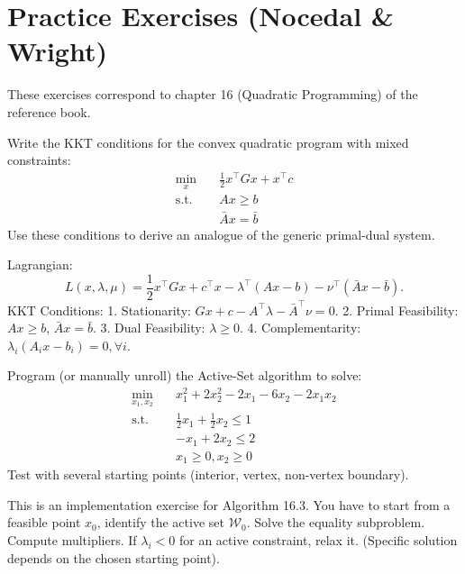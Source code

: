 \section{Practice Exercises (Nocedal \& Wright)}
\label{sec:11.exercises}

These exercises correspond to chapter 16 (Quadratic Programming) of the reference book.

\bigskip
\begin{exercice}
Write the KKT conditions for the convex quadratic program with mixed constraints:
\begin{align*}
    \min_x \quad & \frac{1}{2} x^\top G x + x^\top c \\
    \text{s.t. } \quad & Ax \ge b \\
               & \bar{A}x = \bar{b}
\end{align*}
Use these conditions to derive an analogue of the generic primal-dual system.
\end{exercice}

\begin{correction}
Lagrangian:
$$ L(x, \lambda, \mu) = \frac{1}{2}x^\top G x + c^\top x - \lambda^\top (Ax - b) - \nu^\top (\bar{A}x - \bar{b}). $$
KKT Conditions:
1. Stationarity: $Gx + c - A^\top \lambda - \bar{A}^\top \nu = 0$.
2. Primal Feasibility: $Ax \ge b$, $\bar{A}x = \bar{b}$.
3. Dual Feasibility: $\lambda \ge 0$.
4. Complementarity: $\lambda_i (A_i x - b_i) = 0, \forall i$.
\end{correction}
\bigskip

\bigskip
\begin{exercice}
Program (or manually unroll) the Active-Set algorithm to solve:
\begin{align*}
    \min_{x_1, x_2} \quad & x_1^2 + 2x_2^2 - 2x_1 - 6x_2 - 2x_1 x_2 \\
    \text{s.t. } \quad & \frac{1}{2}x_1 + \frac{1}{2}x_2 \le 1 \\
               & -x_1 + 2x_2 \le 2 \\
               & x_1 \ge 0, x_2 \ge 0
\end{align*}
Test with several starting points (interior, vertex, non-vertex boundary).
\end{exercice}

\begin{correction}
This is an implementation exercise for Algorithm 16.3.
You have to start from a feasible point $x_0$, identify the active set $\mathcal{W}_0$.
Solve the equality subproblem. Compute multipliers. If $\lambda_i < 0$ for an active constraint, relax it.
(Specific solution depends on the chosen starting point).
\end{correction}
\bigskip

